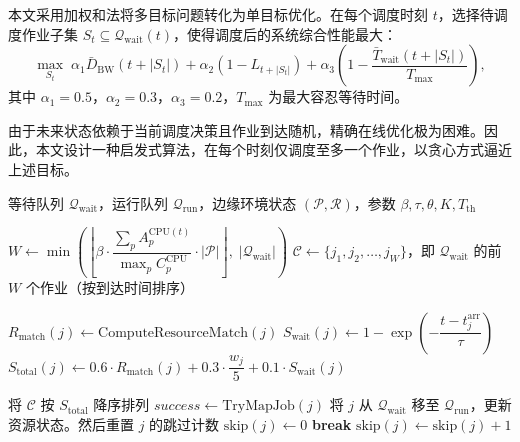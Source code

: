本文采用加权和法将多目标问题转化为单目标优化。在每个调度时刻 $t$，选择待调度作业子集 $S_t \subseteq \mathcal{Q}_{\text{wait}}(t)$，使得调度后的系统综合性能最大：
\begin{equation}
    \max_{S_t} \; \alpha_1 \bar{D}_{\text{BW}}(t+|S_t|) + \alpha_2 \left(1 - L_{t+|S_t|}\right) + \alpha_3 \left(1 - \frac{\bar{T}_{\text{wait}}(t+|S_t|)}{T_{\max}}\right),
\end{equation}
其中 $\alpha_1=0.5$，$\alpha_2=0.3$，$\alpha_3=0.2$，$T_{\max}$ 为最大容忍等待时间。

由于未来状态依赖于当前调度决策且作业到达随机，精确在线优化极为困难。因此，本文设计一种启发式算法，在每个时刻仅调度至多一个作业，以贪心方式逼近上述目标。

\begin{algorithm}[htbp]
    \caption{多作业在线调度算法CES-Multi-Jobs}
    \label{alg:CES-Multi-Jobs}
    \begin{algorithmic}[1]
        \Require 等待队列 $\mathcal{Q}_{\text{wait}}$，运行队列 $\mathcal{Q}_{\text{run}}$，边缘环境状态 $(\mathcal{P},\mathcal{R})$，参数 $\beta,\tau,\theta,K,T_{\text{th}}$
        
            \State $W \gets \min\left( \left\lfloor \beta \cdot \dfrac{\sum_{p} A_p^{\text{CPU}(t)}}{ \max_p C_p^{\text{CPU}} } \cdot |\mathcal{P}| \right\rfloor,\; |\mathcal{Q}_{\text{wait}}| \right)$ 
            \State $\mathcal{C} \gets \{j_1, j_2, \dots, j_W\}$，即 $\mathcal{Q}_{\text{wait}}$ 的前 $W$ 个作业（按到达时间排序）
            
             
                \State $R_{\text{match}}(j) \gets \text{ComputeResourceMatch}(j)$  
                \State $S_{\text{wait}}(j) \gets 1 - \exp\left(-\dfrac{t - t_j^{\text{arr}}}{\tau}\right)$
                \State $S_{\text{total}}(j) \gets 0.6 \cdot R_{\text{match}}(j) + 0.3 \cdot \dfrac{w_j}{5} + 0.1 \cdot S_{\text{wait}}(j)$
            \EndFor
            
            \State 将 $\mathcal{C}$ 按 $S_{\text{total}}$ 降序排列 
                \State $success \gets \text{TryMapJob}(j)$  
                    \State 将 $j$ 从 $\mathcal{Q}_{\text{wait}}$ 移至 $\mathcal{Q}_{\text{run}}$，更新资源状态。然后重置 $j$ 的跳过计数 $\text{skip}(j) \gets 0$
                    \State \textbf{break} 
                \Else
                    \State $\text{skip}(j) \gets \text{skip}(j) + 1$
                \EndIf
            \EndFor
            

\end{algorithmic}
\end{algorithm}
